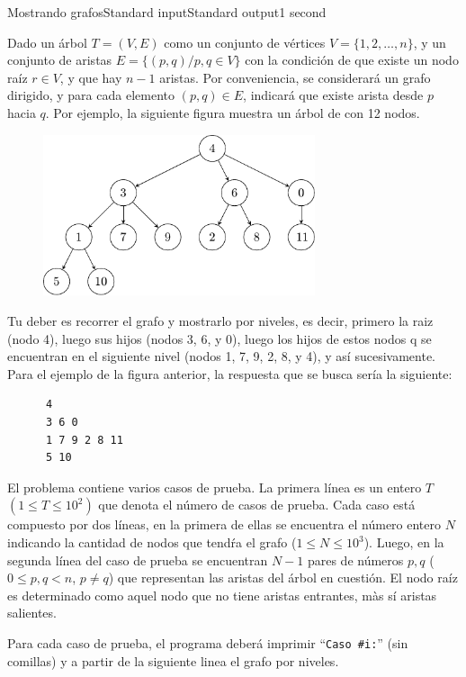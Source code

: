 \begin{problem}{Mostrando grafos}{Standard input}{Standard output}{1 second}{}


Dado un \'arbol $ T = (V, E)$ como un conjunto de v\'ertices $V = \lbrace 1, 2, \dots, n \rbrace$, y un conjunto de aristas $E = \lbrace (p, q) / p, q \in V \rbrace$ con la condici\'on de que existe un nodo ra\'iz $r \in V$, y que hay $n-1$ aristas. Por conveniencia, se considerar\'a un grafo dirigido, y para cada elemento $(p, q) \in E$, indicar\'a que existe arista desde $p$ hacia $q$. Por ejemplo, la siguiente figura muestra un \'arbol de con 12 nodos. 

\begin{figure}[h]
\centering
\includegraphics[width=8cm]{images/tree.pdf}
\end{figure}

Tu deber es recorrer el grafo y mostrarlo por niveles, es decir, primero la raiz (nodo 4), luego sus hijos (nodos 3, 6, y 0), luego los hijos de estos nodos q se encuentran en el siguiente nivel (nodos 1, 7, 9, 2, 8, y 4), y as\'i sucesivamente. Para el ejemplo de la figura anterior, la respuesta que se busca ser\'ia la siguiente:

\begin{verbatim}
      4
      3 6 0
      1 7 9 2 8 11
      5 10
\end{verbatim}

\InputFile
El problema contiene varios casos de prueba. La primera l\'inea es un entero $T$ $(1\leq T \leq 10^2)$ que denota el número de casos de prueba. Cada caso está compuesto por dos l\'ineas, en la primera de ellas se encuentra el n\'umero entero $N$ indicando la cantidad de nodos que tend\'ra el grafo ($1 \leq N \leq 10^3$). Luego, en la segunda l\'inea del caso de prueba se encuentran $N-1$ pares de n\'umeros $p, q$ ($0 \leq p, q < n$, $p \neq q$) que representan las aristas del \'arbol en cuesti\'on. El nodo ra\'iz es determinado como aquel nodo que no tiene aristas entrantes, m\`as s\'i aristas salientes.

\OutputFile
Para cada caso de prueba, el programa deber\'a imprimir ``\texttt{Caso \#i:}'' (sin comillas) y a partir de la siguiente linea el grafo por niveles. 

\Example

\begin{example}
\end{example}

\end{problem}
